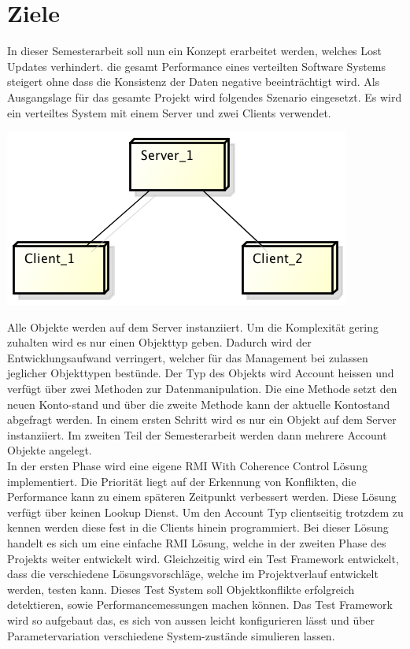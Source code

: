 \documentclass{article}
\begin{document}
\section{Ziele}
In dieser Semesterarbeit soll nun ein Konzept erarbeitet werden, welches Lost Updates verhindert.  die gesamt Performance eines verteilten Software Systems steigert ohne dass die Konsistenz der Daten negative beeinträchtigt wird.
Als Ausgangslage für das gesamte Projekt wird folgendes Szenario eingesetzt. Es wird ein verteiltes System mit einem Server und zwei Clients verwendet.\\
\begin{center}
\includegraphics[scale=0.85]{Deployment.png}
\end{center}
Alle Objekte werden auf dem Server instanziiert. Um die Komplexität gering zuhalten wird es nur einen Objekttyp geben. Dadurch wird der Entwicklungsaufwand verringert, welcher für das Management bei zulassen jeglicher Objekttypen bestünde. Der Typ des Objekts wird Account heissen und verfügt über zwei Methoden zur Datenmanipulation. Die eine Methode setzt den neuen Konto-stand und über die zweite Methode kann der aktuelle Kontostand abgefragt werden. In einem ersten Schritt wird es nur ein Objekt auf dem Server instanziiert. Im zweiten Teil der Semesterarbeit werden dann mehrere Account Objekte angelegt.\\
In der ersten Phase wird eine eigene RMI With Coherence Control Lösung implementiert. Die Priorität liegt auf der Erkennung von Konflikten, die Performance kann zu einem späteren Zeitpunkt verbessert werden. Diese Lösung verfügt über keinen Lookup Dienst. Um den Account Typ clientseitig trotzdem zu kennen werden diese fest in die Clients hinein programmiert. Bei dieser Lösung handelt es sich um eine einfache RMI Lösung, welche in der zweiten Phase des Projekts weiter entwickelt wird.
Gleichzeitig wird ein Test Framework entwickelt, dass die verschiedene Lösungsvorschläge, welche im Projektverlauf entwickelt werden, testen kann. Dieses Test System soll Objektkonflikte erfolgreich detektieren, sowie Performancemessungen machen können. Das Test Framework wird so aufgebaut das, es sich von aussen leicht konfigurieren lässt und über Parametervariation verschiedene System-zustände simulieren lassen.\\
\end{document}
